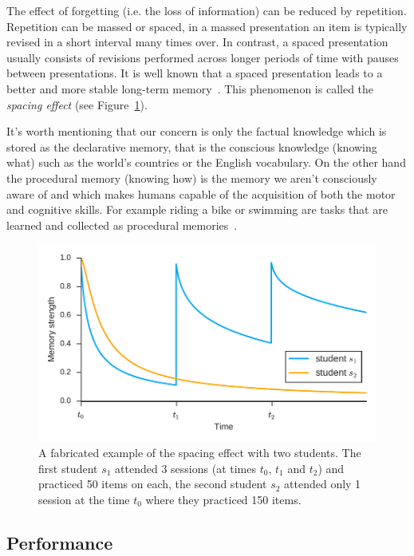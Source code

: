 The effect of forgetting (i.e. the loss of information) can be reduced by repetition. Repetition can be massed or spaced, in a massed presentation an item is typically revised in a short interval many times over. In contrast, a spaced presentation usually consists of revisions performed across longer periods of time with pauses between presentations. It is well known that a spaced presentation leads to a better and more stable long-term memory~\cite{RichardE.Mayer2010}. This phenomenon is called the \textit{spacing effect} (see Figure~\ref{fig:spacing-effect}).

It's worth mentioning that our concern is only the factual knowledge which is stored as the declarative memory, that is the conscious knowledge (knowing what) such as the world's countries or the English vocabulary. On the other hand the procedural memory (knowing how) is the memory we aren't consciously aware of and which makes humans capable of the acquisition of both the motor and cognitive skills. For example riding a bike or swimming are tasks that are learned and collected as procedural memories~\cite{MichaelW.Eysenck2008}.

\begin{figure}[htbp]
  \centering
  \includegraphics[width=\textwidth]{img/spacing-effect}
  \caption{A fabricated example of the spacing effect with two students. The first student $s_1$ attended 3 sessions (at times $t_0$, $t_1$ and $t_2$) and practiced 50 items on each, the second student $s_2$ attended only 1 session at the time $t_0$ where they practiced 150 items.}
  \label{fig:spacing-effect}
\end{figure}

\subsection{Performance}


